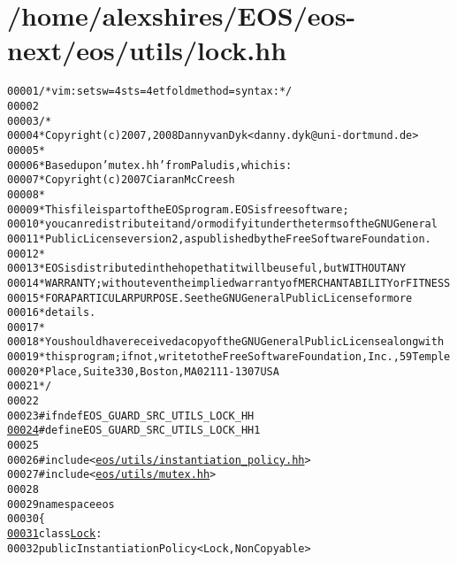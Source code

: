 \hypertarget{lock_8hh_source}{
\section{/home/alexshires/EOS/eos-\/next/eos/utils/lock.hh}
}


\begin{footnotesize}\begin{alltt}
00001 \textcolor{comment}{/* vim: set sw=4 sts=4 et foldmethod=syntax : */}
00002 
00003 \textcolor{comment}{/*}
00004 \textcolor{comment}{ * Copyright (c) 2007, 2008 Danny van Dyk <danny.dyk@uni-dortmund.de>}
00005 \textcolor{comment}{ *}
00006 \textcolor{comment}{ * Based upon 'mutex.hh' from Paludis, which is:}
00007 \textcolor{comment}{ *     Copyright (c) 2007 Ciaran McCreesh}
00008 \textcolor{comment}{ *}
00009 \textcolor{comment}{ * This file is part of the EOS program. EOS is free software;}
00010 \textcolor{comment}{ * you can redistribute it and/or modify it under the terms of the GNU General}
00011 \textcolor{comment}{ * Public License version 2, as published by the Free Software Foundation.}
00012 \textcolor{comment}{ *}
00013 \textcolor{comment}{ * EOS is distributed in the hope that it will be useful, but WITHOUT ANY}
00014 \textcolor{comment}{ * WARRANTY; without even the implied warranty of MERCHANTABILITY or FITNESS}
00015 \textcolor{comment}{ * FOR A PARTICULAR PURPOSE.  See the GNU General Public License for more}
00016 \textcolor{comment}{ * details.}
00017 \textcolor{comment}{ *}
00018 \textcolor{comment}{ * You should have received a copy of the GNU General Public License along with}
00019 \textcolor{comment}{ * this program; if not, write to the Free Software Foundation, Inc., 59 Temple}
00020 \textcolor{comment}{ * Place, Suite 330, Boston, MA  02111-1307  USA}
00021 \textcolor{comment}{ */}
00022 
00023 \textcolor{preprocessor}{#ifndef EOS\_GUARD\_SRC\_UTILS\_LOCK\_HH}
\hypertarget{lock_8hh_source_l00024}{}\hyperlink{lock_8hh_ae5f61308189b80dc261a32a2dc110b6a}{00024} \textcolor{preprocessor}{}\textcolor{preprocessor}{#define EOS\_GUARD\_SRC\_UTILS\_LOCK\_HH 1}
00025 \textcolor{preprocessor}{}
00026 \textcolor{preprocessor}{#include <\hyperlink{instantiation__policy_8hh}{eos/utils/instantiation_policy.hh}>}
00027 \textcolor{preprocessor}{#include <\hyperlink{mutex_8hh}{eos/utils/mutex.hh}>}
00028 
00029 \textcolor{keyword}{namespace }eos
00030 \{
\hypertarget{lock_8hh_source_l00031}{}\hyperlink{classeos_1_1Lock}{00031}     \textcolor{keyword}{class }\hyperlink{classeos_1_1Lock}{Lock} :
00032         \textcolor{keyword}{public} InstantiationPolicy<Lock, NonCopyable>

\end{alltt}
\end{footnotesize}
